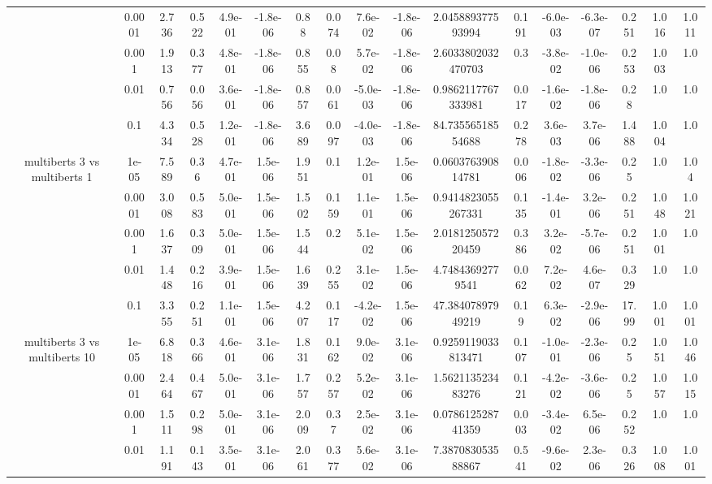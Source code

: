 \begin{tabular}{|c|c|c|c|c|c|c|c|c|c|c|c|c|c|c|c|c|}
 & 0.0001 & 2.736 & 0.522 & 4.9e-01 & -1.8e-06 & 0.88 & 0.074 & 7.6e-02 & -1.8e-06 & 2.045889377593994 & 0.191 & -6.0e-03 & -6.3e-07 & 0.251 & 1.016 & 1.011 \\
 & 0.001 & 1.913 & 0.377 & 4.8e-01 & -1.8e-06 & 0.855 & 0.08 & 5.7e-02 & -1.8e-06 & 2.6033802032470703 & 0.3 & -3.8e-02 & -1.0e-06 & 0.253 & 1.003 & 1.0 \\
 & 0.01 & 0.756 & 0.056 & 3.6e-01 & -1.8e-06 & 0.857 & 0.061 & -5.0e-03 & -1.8e-06 & 0.9862117767333981 & 0.017 & -1.6e-02 & -1.8e-06 & 0.28 & 1.0 & 1.0 \\
 & 0.1 & 4.334 & 0.528 & 1.2e-01 & -1.8e-06 & 3.689 & 0.097 & -4.0e-03 & -1.8e-06 & 84.73556518554688 & 0.278 & 3.6e-03 & 3.7e-06 & 1.488 & 1.004 & 1.0 \\
\hline
\multirow{5}{*}{multiberts 3 vs multiberts 1} & 1e-05 & 7.589 & 0.36 & 4.7e-01 & 1.5e-06 & 1.951 & 0.1 & 1.2e-01 & 1.5e-06 & 0.060376390814781 & 0.006 & -1.8e-02 & -3.3e-06 & 0.25 & 1.0 & 1.04 \\
 & 0.0001 & 3.008 & 0.583 & 5.0e-01 & 1.5e-06 & 1.502 & 0.159 & 1.1e-01 & 1.5e-06 & 0.9414823055267331 & 0.135 & -1.4e-01 & 3.2e-06 & 0.251 & 1.048 & 1.021 \\
 & 0.001 & 1.637 & 0.309 & 5.0e-01 & 1.5e-06 & 1.544 & 0.2 & 5.1e-02 & 1.5e-06 & 2.018125057220459 & 0.386 & 3.2e-02 & -5.7e-06 & 0.251 & 1.001 & 1.0 \\
 & 0.01 & 1.448 & 0.216 & 3.9e-01 & 1.5e-06 & 1.639 & 0.255 & 3.1e-02 & 1.5e-06 & 4.74843692779541 & 0.062 & 7.2e-02 & 4.6e-07 & 0.329 & 1.0 & 1.0 \\
 & 0.1 & 3.355 & 0.251 & 1.1e-01 & 1.5e-06 & 4.207 & 0.117 & -4.2e-02 & 1.5e-06 & 47.38407897949219 & 0.19 & 6.3e-02 & -2.9e-06 & 17.99 & 1.001 & 1.001 \\
\hline
\multirow{5}{*}{multiberts 3 vs multiberts 10} & 1e-05 & 6.818 & 0.366 & 4.6e-01 & 3.1e-06 & 1.831 & 0.162 & 9.0e-02 & 3.1e-06 & 0.9259119033813471 & 0.107 & -1.0e-01 & -2.3e-06 & 0.25 & 1.051 & 1.046 \\
 & 0.0001 & 2.464 & 0.467 & 5.0e-01 & 3.1e-06 & 1.757 & 0.257 & 5.2e-02 & 3.1e-06 & 1.562113523483276 & 0.121 & -4.2e-02 & -3.6e-06 & 0.25 & 1.057 & 1.015 \\
 & 0.001 & 1.511 & 0.298 & 5.0e-01 & 3.1e-06 & 2.009 & 0.37 & 2.5e-02 & 3.1e-06 & 0.078612528741359 & 0.003 & -3.4e-02 & 6.5e-06 & 0.252 & 1.0 & 1.0 \\
 & 0.01 & 1.191 & 0.143 & 3.5e-01 & 3.1e-06 & 2.061 & 0.377 & 5.6e-02 & 3.1e-06 & 7.387083053588867 & 0.541 & -9.6e-02 & 2.3e-06 & 0.326 & 1.008 & 1.001 \\

\end{tabular}
